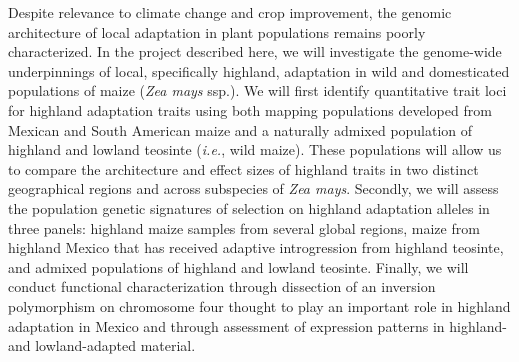 

%
%
%
%
%
%


Despite relevance to climate change and crop improvement, the genomic architecture of local adaptation in plant populations remains poorly characterized.  In the project described here, we will investigate the genome-wide underpinnings of local, specifically highland, adaptation in wild and domesticated populations of maize (\emph{Zea mays} ssp.).  We will first identify quantitative trait loci for highland adaptation traits using both mapping populations developed from Mexican and South American maize and a naturally admixed population of highland and lowland teosinte (\emph{i.e.}, wild maize).  These populations will allow us to compare the architecture and effect sizes of highland traits in two distinct geographical regions and across subspecies of \emph{Zea mays}.  Secondly, we will assess the population genetic signatures of selection on highland adaptation alleles in three panels: highland maize samples from several global regions, maize from highland Mexico that has received adaptive introgression from highland teosinte, and admixed populations of highland and lowland teosinte.  Finally, we will conduct functional characterization through dissection of an inversion polymorphism on chromosome four thought to play an important role in highland adaptation in Mexico and through assessment of expression patterns in highland- and lowland-adapted material.

